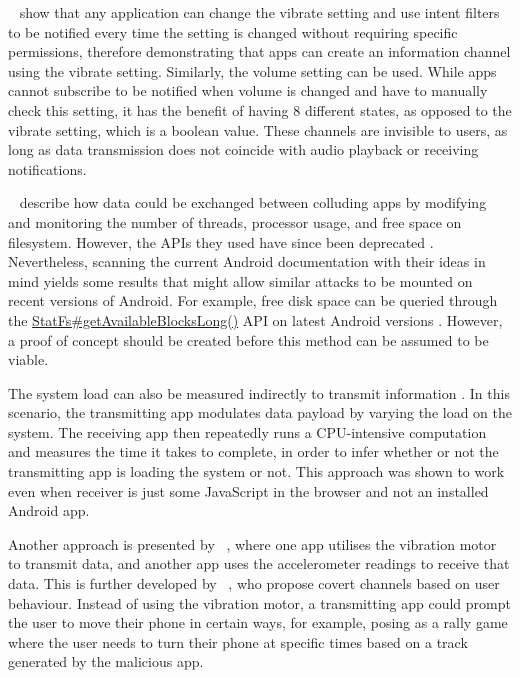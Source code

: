 \documentclass[article, oneside]{aaltoseries}
\newcommand{\TODO}[1]{\todo[inline]{#1}}
\begin{document}
\citeauthor{Schlegel2011}~\cite{Schlegel2011} show that any application can change the vibrate setting and use intent filters to be notified every time the setting is changed without requiring specific permissions, therefore demonstrating that apps can create an information channel using the vibrate setting.  Similarly, the volume setting can be used. While apps cannot subscribe to be notified when volume is changed and have to manually check this setting, it has the benefit of having 8 different states, as opposed to the vibrate setting, which is a boolean value. These channels are invisible to users, as long as data transmission does not coincide with audio playback or receiving notifications.

\citeauthor{Marforio2012}~\cite{Marforio2012} describe how data could be exchanged between colluding apps by modifying and monitoring the number of threads, processor usage, and free space on filesystem. However, the APIs they used have since been deprecated \cite{nn2017}. Nevertheless, scanning the current Android documentation with their ideas in mind yields some results that might allow similar attacks to be mounted on recent versions of Android. For example, free disk space can be queried through the \href{https://developer.android.com/reference/android/os/StatFs.html#getAvailableBlocksLong()}{StatFs\#getAvailableBlocksLong()} API on latest Android versions \cite{AOSPdeveloper}. However, a proof of concept should be created before this method can be assumed to be viable.

The system load can also be measured indirectly to transmit information \cite{Marforio2012}. In this scenario, the transmitting app modulates data payload by varying the load on the system. The receiving app then repeatedly runs a CPU-intensive computation and measures the time it takes to complete, in order to infer whether or not the transmitting app is loading the system or not. This approach was shown to work even when receiver is just some JavaScript in the browser and not an installed Android app.

Another approach is presented by \citeauthor{Al-Haiqi2014}~\cite{Al-Haiqi2014}, where one app utilises the vibration motor to transmit data, and another app uses the accelerometer readings to receive that data. This is further developed by \citeauthor{Qi2018}~\cite{Qi2018}, who propose covert channels based on user behaviour. Instead of using the vibration motor, a transmitting app could prompt the user to move their phone in certain ways, for example, posing as a rally game where the user needs to turn their phone at specific times based on a track generated by the malicious app.
\\
\TODO{Add a subsection conclusion paragraph}
\end{document}
